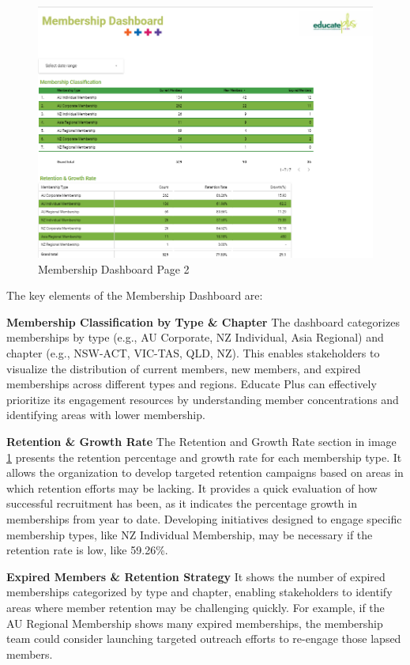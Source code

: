 \documentclass[11pt,a4paper,]{article}
\begin{document}
\begin{figure}[H]

{\centering \includegraphics[width=0.9\linewidth]{Images/membership_dashboard_page_2} 

}

\caption{Membership Dashboard Page 2}\label{fig:membership-2}
\end{figure}

The key elements of the Membership Dashboard are:

\textbf{Membership Classification by Type \& Chapter}
The dashboard categorizes memberships by type (e.g., AU Corporate, NZ Individual, Asia Regional) and chapter (e.g., NSW-ACT, VIC-TAS, QLD, NZ). This enables stakeholders to visualize the distribution of current members, new members, and expired memberships across different types and regions. Educate Plus can effectively prioritize its engagement resources by understanding member concentrations and identifying areas with lower membership.

\textbf{Retention \& Growth Rate}
The Retention and Growth Rate section in image \ref{fig:membership-2} presents the retention percentage and growth rate for each membership type. It allows the organization to develop targeted retention campaigns based on areas in which retention efforts may be lacking. It provides a quick evaluation of how successful recruitment has been, as it indicates the percentage growth in memberships from year to date. Developing initiatives designed to engage specific membership types, like NZ Individual Membership, may be necessary if the retention rate is low, like 59.26\%.

\textbf{Expired Members \& Retention Strategy}
It shows the number of expired memberships categorized by type and chapter, enabling stakeholders to identify areas where member retention may be challenging quickly. For example, if the AU Regional Membership shows many expired memberships, the membership team could consider launching targeted outreach efforts to re-engage those lapsed members.
\end{document}
